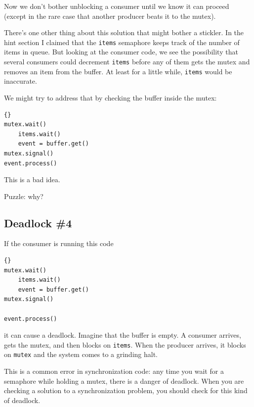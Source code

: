 \documentclass{book}
\newcommand{\clearemptydoublepage}{\newpage\cleardoublepage}
\begin{document}
Now we don't bother unblocking a consumer until we know it can proceed
(except in the rare case that another producer beats it to the mutex).

There's one other thing about this solution that might bother
a stickler.  In the hint section I claimed that the {\tt items}
semaphore keeps track of the number of items in queue.  But looking
at the consumer code, we see the possibility that several consumers
could decrement {\tt items} before any of them gets the mutex
and removes an item from the buffer.  At least for a little while,
{\tt items} would be inaccurate.

We might try to address that by checking the buffer inside the
mutex:

\begin{latin}
\begin{latin}
\begin{lstlisting}[title={Broken consumer solution}]{}
mutex.wait()
    items.wait()
    event = buffer.get()
mutex.signal()
event.process()
\end{lstlisting}
\end{latin}
\end{latin}

This is a bad idea.

Puzzle: why?


\clearemptydoublepage
\subsection{Deadlock \#4}

If the consumer is running this code

\begin{latin}
\begin{latin}
\begin{lstlisting}[title={Broken consumer solution}]{}
mutex.wait()
    items.wait()
    event = buffer.get()
mutex.signal()

event.process()
\end{lstlisting}
\end{latin}
\end{latin}
%
it can cause a deadlock.  Imagine that the buffer is empty.
A consumer arrives, gets the mutex, and then blocks on
{\tt items}.  When the producer arrives, it blocks on
{\tt mutex} and the system comes to a grinding halt.

This is a common error in synchronization code: any time
you wait for a semaphore while holding a mutex, there is
a danger of deadlock.  When you are checking a solution to
a synchronization problem, you should check for this kind
of deadlock.
\end{document}
